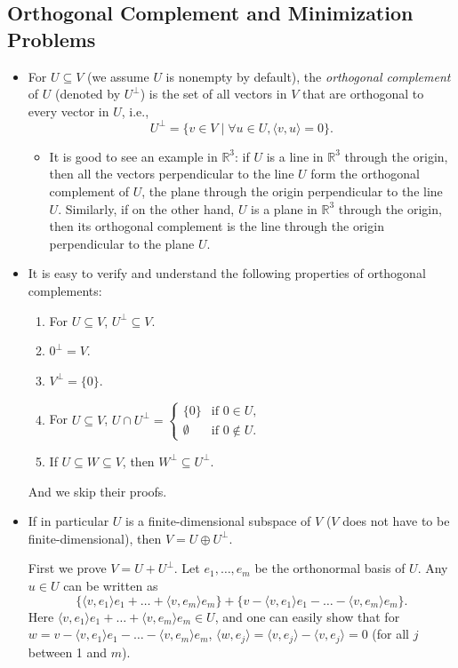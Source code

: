 \documentclass{article}
\newcommand{\R}{\mathbb{R}}
\newcommand{\inp}[2]{\langle #1, #2 \rangle}
\begin{document}
\subsection{Orthogonal Complement and Minimization Problems}
\begin{itemize}
    \item For $U \subseteq V$ (we assume $U$ is nonempty by default), the \textit{orthogonal complement} of $U$ (denoted by $U^\perp$) is the set of all vectors in $V$ that are orthogonal to every vector in $U$, i.e., $$U^\perp = \{v \in V \mid \forall u \in U, \inp{v}{u}=0\}.$$
    \begin{itemize}
        \item It is good to see an example in $\R^3$: if $U$ is a line in $\R^3$ through the origin, then all the vectors perpendicular to the line $U$ form the orthogonal complement of $U$, the plane through the origin perpendicular to the line $U$. Similarly, if on the other hand, $U$ is a plane in $\R^3$ through the origin, then its orthogonal complement is the line through the origin perpendicular to the plane $U$.
    \end{itemize}
    \item It is easy to verify and understand the following properties of orthogonal complements:
    \begin{enumerate}[label=(\alph*)]
        \item For $U \subseteq V$, $U^\perp \subseteq V$.
        \item $0^\perp = V$.
        \item $V^\perp = \{0\}$.
        \item For $U \subseteq V$, $U \cap U^\perp = \left\{\begin{array}{rl} \{0\} & \text{if } 0 \in U, \\ \emptyset \;\, & \text{if } 0 \notin U. \end{array} \right.$
        \item If $U \subseteq W \subseteq V$, then $W^\perp \subseteq U^\perp$.
    \end{enumerate}
    And we skip their proofs.
    \item If in particular $U$ is a finite-dimensional subspace of $V$ ($V$ does not have to be finite-dimensional), then $V = U \oplus U^\perp$.
    
    First we prove $V = U + U^\perp$. Let $e_1,\dots,e_m$ be the orthonormal basis of $U$. Any $u \in U$ can be written as $$\{\inp{v}{e_1}e_1+\dots+\inp{v}{e_m}e_m\} + \{v - \inp{v}{e_1}e_1-\dots-\inp{v}{e_m}e_m\}.$$ Here $\inp{v}{e_1}e_1+\dots+\inp{v}{e_m}e_m \in U$, and one can easily show that for $w = v - \inp{v}{e_1}e_1-\dots-\inp{v}{e_m}e_m$, $\inp{w}{e_j} = \inp{v}{e_j} - \inp{v}{e_j} = 0$ (for all $j$ between 1 and $m$).
    

\end{itemize}
\end{document}
